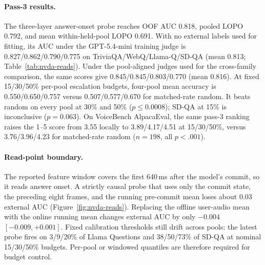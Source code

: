 \paragraph{Pass-3 results.}
The three-layer answer-onset probe reaches OOF AUC 0.818, pooled LOPO
0.792, and mean within-held-pool LOPO 0.691. With no external labels
used for fitting, its AUC under the GPT-5.4-mini training judge is
0.827/0.862/0.790/0.775 on TriviaQA/WebQ/Llama-Q/SD-QA (mean 0.813;
Table~\ref{tab:nvda-reads}). Under the pool-aligned judges used for
the cross-family comparison, the same scores give
0.845/0.845/0.803/0.770 (mean 0.816). At fixed 15/30/50\% per-pool
escalation budgets, four-pool mean accuracy is 0.550/0.650/0.757
versus 0.507/0.577/0.670 for matched-rate random. It beats random on
every pool at 30\% and 50\% ($p\le0.0008$); SD-QA at 15\% is
inconclusive ($p{=}0.063$). On VoiceBench AlpacaEval, the same pass-3
ranking raises the 1--5 score from 3.55 locally to 3.89/4.17/4.51 at
15/30/50\%, versus 3.76/3.96/4.23 for matched-rate random
($n{=}198$, all $p<.001$).

\paragraph{Read-point boundary.}
The reported feature window covers the first 640\,ms after the model's
commit, so it reads answer onset. A strictly causal probe that uses
only the commit state, the preceding eight frames, and the running
pre-commit mean loses about 0.03 external AUC
(Figure~\ref{fig:nvda-reads}). Replacing the offline user-audio mean
with the online running mean changes external AUC by only
$-0.004$ $[-0.009,+0.001]$. Fixed calibration thresholds still drift
across pools: the latest probe fires on 3/9/20\% of Llama Questions
and 38/50/73\% of SD-QA at nominal 15/30/50\% budgets. Per-pool or
windowed quantiles are therefore required for budget control.

